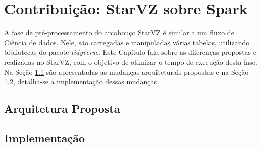 \chapter{Contribuição: StarVZ sobre Spark} \label{ch:contribution}

A fase de pré-processamento do arcabouço StarVZ é similar a um fluxo de Ciência 
de dados. Nele, são carregadas e manipuladas várias tabelas, utilizando 
bibliotecas do pacote \emph{tidyverse}. Este Capítulo fala sobre as diferenças 
propostas e realizadas no StarVZ, com o objetivo de otimizar o tempo de 
execução desta fase. Na Seção \ref{sect:arch} são apresentadas as mudanças 
arquiteturais propostas e na Seção \ref{sect:implement}, detalha-se a 
implementação dessas mudanças.

\section{Arquitetura Proposta} \label{sect:arch}


\section{Implementação} \label{sect:implement}
